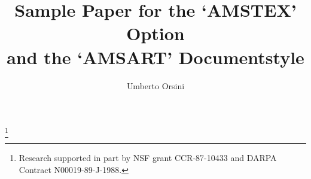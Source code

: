 %

\def\BibTeX{{\rm B\kern-.05em{\sc i\kern-.025em b}\kern-.08em
    T\kern-.1667em\lower.7ex\hbox{E}\kern-.125emX}}


\newtheorem{thm}{Theorem}[section]
\newtheorem{cor}[thm]{Corollary}
\newtheorem{lem}[thm]{Lemma}
\newtheorem{prop}[thm]{Proposition}
\newtheorem{exmp}[thm]{Example}
\newtheorem{conj}{Conjecture}
\theoremstyle{definition}
\newtheorem{defn}{Definition}[section]
\theoremstyle{remark}
\newtheorem{rem}{Remark}[section]
\newtheorem{notation}{Notation}
\renewcommand{\thenotation}{}  %


\newcommand{\C}{\mathbbb{C}}
\newcommand{\N}{\mathbbb{N}}
\newcommand{\Q}{\mathbbb{Q}}
\newcommand{\R}{\mathbbb{R}}
\newcommand{\Z}{\mathbbb{Z}}
\newcommand{\cov}{\operatorname{cov}}
\newcommand{\cf}{\operatorname{cf}}
\newcommand{\add}{\operatorname{add}}
\newcommand{\non}{\operatorname{non}}
\newcommand{\per}{\operatorname{per}}
\newcommand{\End}{\operatorname{End}}



\title[AMSTEX/AMSART Sample Paper] %
{Sample Paper for the `AMSTEX' Option\\
and the `AMSART' Documentstyle}

%
\author{Umberto Orsini}
\address[Umberto Orsini]{Department of Mathematical Sciences\\
        Northern Illinois University\\
        DeKalb, Illinois 60115}
\thanks{Research supported in part by NSF grant
CCR-87-10433 and DARPA Contract N00019-89-J-1988.}

